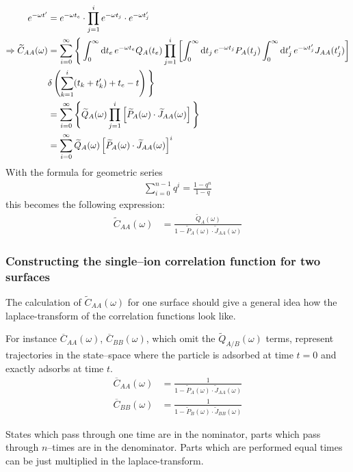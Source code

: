 \documentclass[a4paper, parskip=half]{scrartcl}
\newcommand{\diff}{\mathop{}\!\mathrm{d}}
\begin{document}
\begin{align}
e^{-\omega t'} &= e^{-\omega t_e} \cdot \prod_{j=1}^i e^{-\omega t_j} \cdot e^{-\omega t_j'}\\
\Rightarrow  \widetilde{C}_{AA}(\omega) &= \sum_{i=0}^\infty \Bigg\lbrace \int_0^\infty \diff t_e\, e^{-\omega t_e} Q_A(t_e) \prod_{j=1}^i \left[ \int_0^\infty \diff t_j\, e^{-\omega t_j} P_A(t_j) \int_0^\infty \diff t_j'\, e^{-\omega t_j'} J_{AA}(t_j')\right]\notag\\ 
&\delta \left(\sum_{k=1}^i(t_k+t_k') + t_e - t \right) \Bigg\rbrace\\
&= \sum_{i=0}^\infty \Bigg\lbrace \widetilde{Q}_A(\omega) \prod_{j=1}^i \left[\widetilde{P}_A(\omega) \cdot \widetilde{J}_{AA}(\omega) \right]  \Bigg\rbrace \\
&= \sum_{i=0}^\infty \widetilde{Q}_A(\omega) \left[\widetilde{P}_A(\omega) \cdot \widetilde{J}_{AA}(\omega) \right]^i
\end{align}
With the formula for geometric series 
\begin{align}
\sum_{i=0}^{n-1}q^i = \frac{1-q^n}{1-q} 
\end{align}
this becomes the following expression:
\begin{align}
\widetilde{C}_{AA}(\omega) &= \frac{\widetilde{Q}_A(\omega)}{1-\widetilde{P}_A(\omega) \cdot \widetilde{J}_{AA}(\omega)}
\end{align}
\subsubsection{Constructing the single--ion correlation function for two surfaces}
The calculation of $\widetilde{C}_{AA}(\omega)$ for one surface should give a general idea how the laplace-transform of the correlation functions look like.

For instance $\overline{C}_{AA}(\omega)$, $\overline{C}_{BB}(\omega)$, which omit the $\widetilde{Q}_{A/B}(\omega)$ terms, represent trajectories in the state--space where the particle is adsorbed at time $t=0$ and exactly adsorbs at time $t$. 
\begin{align}
\overline{C}_{AA}(\omega) &= \frac{1}{1-\widetilde{P}_A(\omega) \cdot \widetilde{J}_{AA}(\omega)} \\
\overline{C}_{BB}(\omega) &= \frac{1}{1-\widetilde{P}_B(\omega) \cdot \widetilde{J}_{BB}(\omega)} 
\end{align}

States which pass through one time are in the nominator, parts which pass through $n$--times are in the denominator. Parts which are performed equal times can be just multiplied in the laplace-transform.
\end{document}
